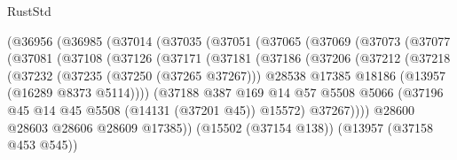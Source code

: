 \begin{lexlean}{RustStd}
\begin{coremodule}
                    (@36956
                      (@36985
                        (@37014
                          (@37035
                            (@37051
                              (@37065
                                (@37069
                                  (@37073
                                    (@37077
                                      (@37081
                                        (@37108
                                          (@37126
                                            (@37171
                                              (@37181
                                                (@37186
                                                  (@37206
                                                    (@37212
                                                      (@37218
                                                        (@37232
                                                          (@37235 (@37250 (@37265 @37267)))
                                                          @28538
                                                          @17385
                                                          @18186
                                                          (@13957 (@16289 @8373 @5114))))
                                                      (@37188
                                                        @387
                                                        @169
                                                        @14
                                                        @57
                                                        @5508
                                                        @5066
                                                        (@37196
                                                          @45
                                                          @14
                                                          @45
                                                          @5508
                                                          (@14131 (@37201 @45))
                                                          @15572)
                                                        @37267))))
                                                @28600
                                                @28603
                                                @28606
                                                @28609
                                                @17385))
                                            (@15502 (@37154 @138))
                                            (@13957 (@37158 @453 @545))

\end{coremodule}
\end{lexlean}
